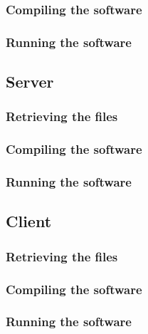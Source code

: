 \documentclass[a4paper,12pt]{article}
\begin{document}
    		\subsubsection {Compiling the software}
    		
    		\subsubsection {Running the software} 
    	
     	\subsection{Server}
     	
	    	\subsubsection {Retrieving the files}
   	    		
	     	\subsubsection {Compiling the software}
	     	
	     	\subsubsection {Running the software}
     
     	\subsection{Client}
     	
     		\subsubsection {Retrieving the files}
     		
     		\subsubsection {Compiling the software}
     		
     		\subsubsection {Running the software}
     
\end{document}

